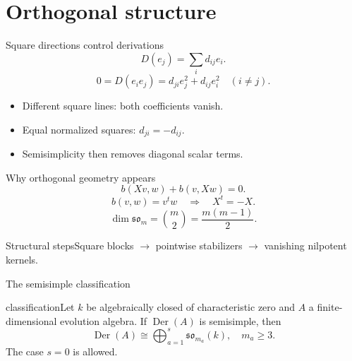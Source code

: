\documentclass{beamer}
\begin{document}
\section[Orthogonal blocks]{Orthogonal structure}
\begin{frame}{Square directions control derivations}
\[D(e_j)=\sum_i d_{ij}e_i.\]\[0=D(e_ie_j)=d_{ji}e_j^2+d_{ij}e_i^2\quad(i\ne j).\]\begin{itemize}\item Different square lines: both coefficients vanish.\item Equal normalized squares: $d_{ji}=-d_{ij}$.\item Semisimplicity then removes diagonal scalar terms.\end{itemize}
\end{frame}
\begin{frame}{Why orthogonal geometry appears}
\[b(Xv,w)+b(v,Xw)=0.\]\[b(v,w)=v^tw\quad\Longrightarrow\quad X^t=-X.\]\[\dim\mathfrak{so}_m=\binom m2=\frac{m(m-1)}2.\]\begin{block}{Structural steps}Square blocks $\to$ pointwise stabilizers $\to$ vanishing nilpotent kernels.\end{block}
\end{frame}
\begin{frame}{The semisimple classification}
\begin{bookresult}{classification}Let $k$ be algebraically closed of characteristic zero and $A$ a finite-dimensional evolution algebra. If $\operatorname{Der}(A)$ is semisimple, then\[\operatorname{Der}(A)\cong\bigoplus_{a=1}^{s}\mathfrak{so}_{m_a}(k),\quad m_a\ge3.\]The case $s=0$ is allowed.\end{bookresult}
\end{frame}
\end{document}

